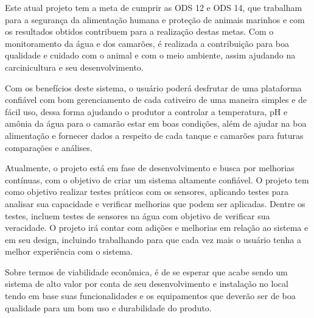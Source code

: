 Este atual projeto tem a meta de cumprir as ODS 12 e ODS 14, que trabalham para a segurança da alimentação humana e proteção de animais marinhos e com os resultados obtidos contribuem para a realização destas metas. Com o monitoramento da água e dos camarões, é realizada a contribuição para boa qualidade e cuidado com o animal e com o meio ambiente, assim ajudando na carcinicultura e seu desenvolvimento.

Com os benefícios deste sistema, o usuário poderá desfrutar de uma plataforma confiável com bom gerenciamento de cada cativeiro de uma maneira simples e de fácil uso, dessa forma ajudando o produtor a controlar a temperatura, pH e amônia da água para o camarão estar em boas condições, além de ajudar na boa alimentação e fornecer dados a respeito de cada tanque e camarões para futuras comparações e análises.

Atualmente, o projeto está em fase de desenvolvimento e busca por melhorias contínuas, com o objetivo de criar um sistema altamente confiável. O projeto tem como objetivo realizar testes práticos com os sensores, aplicando testes para analisar sua capacidade e verificar melhorias que podem ser aplicadas. Dentre os testes, incluem testes de sensores na água com objetivo de verificar sua veracidade. O projeto irá contar com adições e melhorias em relação ao sistema e em seu design, incluindo  trabalhando para que cada vez mais o usuário tenha a melhor experiência com o sistema. 

Sobre termos de viabilidade econômica, é de se esperar que acabe sendo um sistema de alto valor por conta de seu desenvolvimento e instalação no local tendo em base suas funcionalidades e os equipamentos que deverão ser de boa qualidade para um bom uso e durabilidade do produto.

